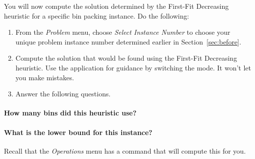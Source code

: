 \documentclass[11pt,letterpaper]{article}
\begin{document}

You will now compute the solution determined by the First-Fit Decreasing
heuristic for a specific bin packing instance. Do the following:
\begin{enumerate}[leftmargin=*, parsep=0pt, itemsep=2pt, topsep=2pt, partopsep=0pt]
\item From the {\em Problem} menu, choose {\em Select Instance Number}
to choose your unique problem instance number determined earlier in 
Section~\ref{sec:before}.
\item Compute the solution that would be found using the First-Fit Decreasing
heuristic. Use the application for guidance by switching the mode.
It won't let you make mistakes.
\item Answer the following questions.
\end{enumerate}

\vspace*{-0.25in}

\paragraph*{How many bins did this heuristic use?}

\vspace*{0.25in}

\paragraph*{What is the lower bound for this instance?} Recall that the
{\em Operations} menu has a command that will compute this for you.

\vspace*{0.25in}
\end{document}
